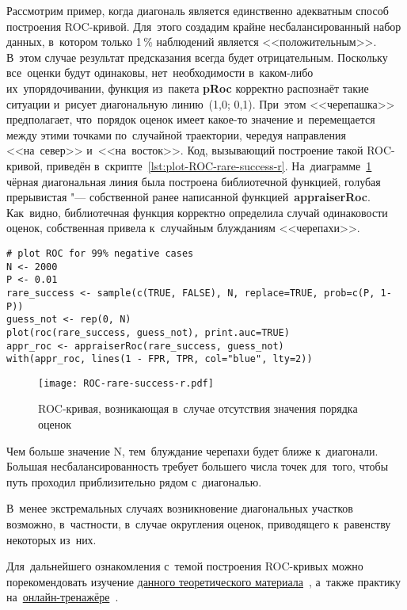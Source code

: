 \documentclass[]{scrreprt}
\begin{document}
Рассмотрим пример, когда диагональ является единственно адекватным способ построения ROC-кривой. Для~этого создадим крайне несбалансированный набор данных, в~котором только 1\,\% наблюдений является <<положительным>>. В~этом случае результат предсказания всегда будет отрицательным. Поскольку все~оценки будут одинаковы, нет~необходимости в~каком-либо их~упорядочивании, функция из~пакета \textbf{pRoc} корректно распознаёт такие ситуации и~рисует диагональную линию~(1,0; 0,1). При~этом <<черепашка>> предполагает, что~порядок оценок имеет какое-то значение и~перемещается между этими точками по~случайной траектории, чередуя направления <<на~север>> и~<<на~восток>>. Код, вызывающий построение такой ROC-кривой, приведён в~скрипте~\ref{lst:plot-ROC-rare-success-r}. На~диаграмме~\ref{fig:ROC-rare-success-r} чёрная диагональная линия была построена библиотечной функцией, голубая прерывистая "--- собственной ранее написанной функцией~\textbf{appraiserRoc}. Как~видно, библиотечная функция корректно определила случай одинаковости оценок, собственная привела к~случайным блужданиям <<черепахи>>.
%
\begin{lstlisting}[float, caption = Построение ROC-кривой в~случае отсутвия значения порядка оценок, firstnumber=1, label= lst:plot-ROC-rare-success-r]
# plot ROC for 99% negative cases
N <- 2000
P <- 0.01
rare_success <- sample(c(TRUE, FALSE), N, replace=TRUE, prob=c(P, 1-P))
guess_not <- rep(0, N)
plot(roc(rare_success, guess_not), print.auc=TRUE)
appr_roc <- appraiserRoc(rare_success, guess_not)
with(appr_roc, lines(1 - FPR, TPR, col="blue", lty=2))
\end{lstlisting}
%
\begin{figure}[ht]
	\centering
	\texttt{[image: ROC-rare-success-r.pdf]}
	\caption{ROC-кривая, возникающая в~случае отсутствия значения порядка оценок}
	\label{fig:ROC-rare-success-r}
\end{figure}
%

Чем больше значение N, тем~блуждание черепахи будет ближе к~диагонали. Большая несбалансированность требует большего числа точек для~того, чтобы путь проходил приблизительно рядом с~диагональю.

В~менее экстремальных случаях возникновение диагональных участков возможно, в~частности, в~случае округления оценок, приводящего к~равенству некоторых из~них. 

Для~дальнейшего ознакомления с~темой построения ROC-кривых можно порекомендовать изучение \href{file:///home/kaarlahti/Downloads/ROCintro.pdf}{данного теоретического материала}~\cite{ROC-analysis}, а~также практику на~\href{https://kennis-research.shinyapps.io/ROC-Curves/}{онлайн-тренажёре}~\cite{ROC-curve-practice}.
\end{document}
